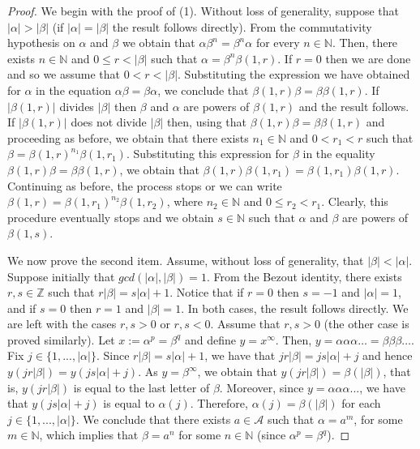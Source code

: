 \documentclass[a4paper,12pt]{amsart}
\theoremstyle{definition}
\theoremstyle{remark}
\numberwithin{equation}{section}
\newcommand{\alf}{\mathscr{A}}
\newcommand{\N}{\mathbb{N}}
\newcommand{\Z}{\mathbb{Z}}
\begin{document}
\begin{proof}
We begin with the proof of (1). Without loss of generality, suppose that $|\alpha|>|\beta|$ (if $|\alpha|=|\beta|$ the result follows directly). From the commutativity hypothesis on $\alpha$ and $\beta$ we obtain that $\alpha \beta^n = \beta^n \alpha$ for every $n\in \N$. Then, there exists $n\in \N$ and $0\leq r < |\beta|$ such that $\alpha = \beta^n \beta(1,r)$. If $r=0$ then we are done and so we assume that $0< r < |\beta|$. Substituting the expression we have obtained for $\alpha$ in the equation $\alpha \beta = \beta \alpha$, we conclude that $\beta(1,r)\beta = \beta \beta(1,r)$. If $|\beta(1,r)|$ divides $|\beta|$ then $\beta$ and $\alpha$ are powers of $\beta(1,r)$ and the result follows.  If $|\beta(1,r)|$ does not divide $|\beta|$ then, using that $\beta(1,r)\beta = \beta \beta(1,r)$ and proceeding as before, we obtain that there exists $n_1\in \N$ and $0<r_1<r$ such that  $\beta = \beta(1,r)^{n_1}\beta(1,r_1)$. Substituting this expression for $\beta$ in the equality $\beta(1,r)\beta = \beta \beta(1,r)$, we obtain that $\beta(1,r)\beta(1,r_1)=\beta(1,r_1)\beta(1,r)$. Continuing as before, the process stops or we can write $\beta(1,r)= \beta(1,r_1)^{n_2} \beta(1,r_2)$, where $n_2\in \N$ and $0\leq r_2 <r_1$. Clearly, this procedure eventually stops and we obtain $s\in \N$ such that $\alpha$ and $\beta$ are powers of $\beta(1,s)$.

We now prove the second item. Assume, without loss of generality, that $|\beta|<|\alpha|$.
Suppose initially that $gcd(|\alpha|, |\beta|)=1$. From the Bezout identity, there exists $r,s\in \Z$ such that $r|\beta|=s|\alpha|+1$. Notice that if $r=0$ then $s=-1$ and $|\alpha|=1$, and if $s=0$ then  $r=1$ and $|\beta|=1$. In both cases, the result follows directly. We are left with the cases $r,s>0$ or $r,s<0$. Assume that $r,s>0$ (the other case is proved similarly). Let $x:=\alpha^p=\beta^q$ and define $y=x^\infty$. Then,  $y=\alpha\alpha\alpha\ldots = \beta\beta\beta\ldots$. Fix $j\in \{1,...,|\alpha|\}$.  Since $r|\beta|=s|\alpha|+1$, we have that $j r|\beta|=js|\alpha|+j$ and hence $y(jr|\beta|)=y(js|\alpha|+j)$. As $y=\beta^\infty$, we obtain that $y(jr|\beta|)=\beta(|\beta|)$, that is, $y(jr|\beta|)$ is equal to the last letter of $\beta$. Moreover, since $y=\alpha\alpha\alpha...$, we have that $y(js|\alpha|+j)$ is equal to $\alpha(j)$. Therefore, $\alpha(j)=\beta(|\beta|)$ for each $j\in \{1,...,|\alpha|\}$. We conclude that there exists $a\in\alf$ such that $\alpha=a^{m}$, for some $m\in \N$, which implies that $\beta=a^n$ for some $n\in \N$ (since $\alpha^p=\beta^q$). 


\end{proof}
\end{document}
